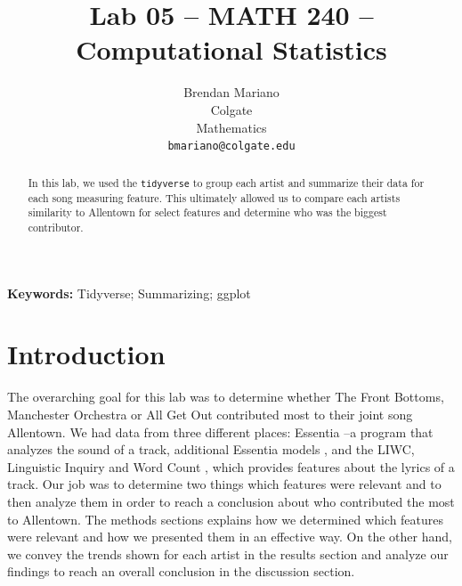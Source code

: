 \documentclass{article}\usepackage[]{graphicx}\usepackage[]{xcolor}
\begin{document}
\vspace{-1in}
\title{Lab 05 -- MATH 240 -- Computational Statistics}

\author{
  Brendan Mariano \\
  Colgate  \\
  Mathematics  \\
  {\tt bmariano@colgate.edu}
}

\date{}

\maketitle

\begin{multicols}{2}
\begin{abstract}
In this lab, we used the \texttt{tidyverse} to group each artist and summarize their data for each song measuring feature. This ultimately allowed us to compare each artists similarity to Allentown for select features and determine who was the biggest contributor. 
\end{abstract}

\noindent \textbf{Keywords:} Tidyverse; Summarizing; ggplot

\section{Introduction}
The overarching goal for this lab was to determine whether The Front Bottoms, Manchester Orchestra or All Get Out contributed most to their joint song Allentown. We had data from three different places: Essentia \citep{essentia}--a program that analyzes the sound of a track, additional Essentia models \citep{essentia_models}, and the LIWC, Linguistic Inquiry and Word Count \citep{liwc}, which provides features about the lyrics of a track. Our job was to determine two things which features were relevant and to then analyze them in order to reach a conclusion about who contributed the most to Allentown. 
  The methods sections explains how we determined which features were relevant and how we presented them in an effective way. On the other hand, we convey the trends shown for each artist in the results section and analyze our findings to reach an overall conclusion in the discussion section. 



\end{multicols}
\end{document}
